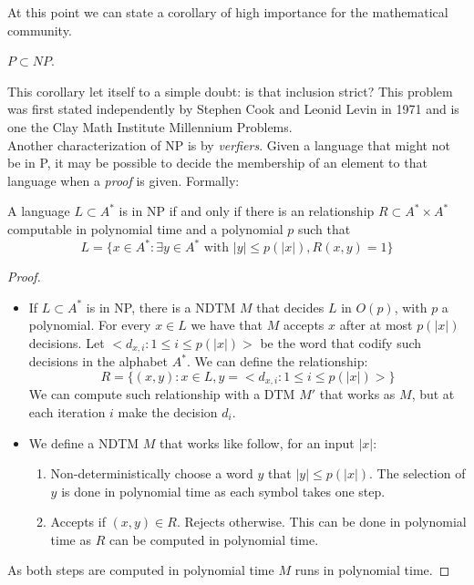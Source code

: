 At this point we can state a corollary of high importance for the mathematical community.

\begin{corollary}
  $P \subset NP$.
\end{corollary}

This corollary let itself to a simple doubt: is that inclusion strict? This problem was first stated independently by Stephen Cook and  Leonid Levin in 1971\cite{cook2006p} and is one the Clay Math Institute Millennium Problems.\\

Another characterization of NP is by \emph{verfiers}. Given a language that might not be in P, it may be possible to decide the membership of an element to that language when a \emph{proof} is given. Formally:

\begin{proposition}
  A language $L\subset A^*$ is in NP if and only if there is an relationship $R\subset A^*\times A^*$  computable in polynomial time and a polynomial $p$ such that
  $$L = \{x \in A^*:\exists y \in A^* \text{ with } |y | \le p(|x|), R(x, y) = 1\}$$
\end{proposition}
\begin{proof}\hfill
\begin{itemize}
\item[\fbox{$\Rightarrow$}] If $L\subset A^*$ is in NP, there is a NDTM $M$ that decides $L$ in $O(p)$, with $p$ a polynomial. For every $x\in L$ we have that $M$ accepts $x$ after at most $p(|x|)$ decisions. Let $<d_{x,i} : 1 \le i \le p(|x|)>$ be the word that codify such decisions in the alphabet $A^*$. We can define the relationship:
  $$R = \{(x,y)  : x \in L, y = <d_{x,i} : 1 \le i \le p(|x|)>\}$$
  We can compute such relationship with a DTM $M'$ that works as $M$, but at each iteration $i$ make the decision $d_i$. 
\item[\fbox{$\Leftarrow$}] We define a NDTM $M$ that works like follow, for an input $|x|$:
  \begin{enumerate}
  \item Non-deterministically choose a word $y$ that $|y|\le p(|x|)$. The selection of $y$ is done in polynomial time as each symbol takes one step.
  \item Accepts if $(x,y)\in R$. Rejects otherwise. This can be done in polynomial time as $R$ can be computed in polynomial time.
    \end{enumerate}
  \end{itemize}
  As both steps are computed in polynomial time $M$ runs in polynomial time.  
\end{proof}

